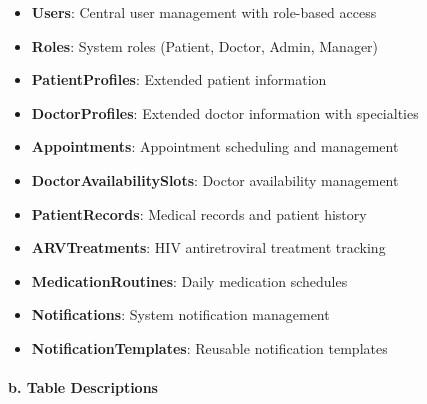 \documentclass[12pt,a4paper]{article}
\begin{document}
\begin{itemize}
    \item \textbf{Users}: Central user management with role-based access
    \item \textbf{Roles}: System roles (Patient, Doctor, Admin, Manager)
    \item \textbf{PatientProfiles}: Extended patient information
    \item \textbf{DoctorProfiles}: Extended doctor information with specialties
    \item \textbf{Appointments}: Appointment scheduling and management
    \item \textbf{DoctorAvailabilitySlots}: Doctor availability management
    \item \textbf{PatientRecords}: Medical records and patient history
    \item \textbf{ARVTreatments}: HIV antiretroviral treatment tracking
    \item \textbf{MedicationRoutines}: Daily medication schedules
    \item \textbf{Notifications}: System notification management
    \item \textbf{NotificationTemplates}: Reusable notification templates
\end{itemize}

\paragraph{b. Table Descriptions}
\end{document}
